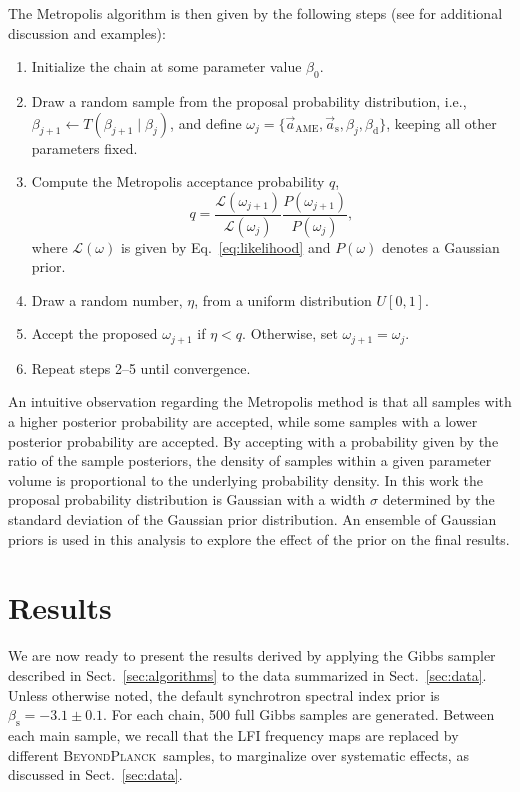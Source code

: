\documentclass[twocolumn]{aa}
\renewcommand{\a}[0]{\vec{a}}
\newcommand{\BP}{\textsc{BeyondPlanck}}
\begin{document}
The Metropolis algorithm is then given by the following steps (see
\citealp{bp01} for additional discussion and examples):
\begin{enumerate}
\item Initialize the chain at some parameter value $\beta_0$.
\item Draw a random sample from the proposal probability distribution,
  i.e., $\beta_{j+1} \leftarrow  T(\beta_{j+1} \mid \beta_j)$, and
  define $\omega_j = \{\a_{\mathrm{AME}},
\a_{\mathrm{s}}, \beta_{j}, \beta_{\mathrm{d}}\}$, keeping
all other parameters fixed. 
\item Compute the Metropolis acceptance probability $q$,
  \begin{equation}
    q = \frac{\mathcal{L}(\omega_{j+1})}{\mathcal{L}(\omega_{j})}\frac{P(\omega_{j+1})}{P(\omega_{j})},
    \label{eq:accept_prob}
  \end{equation}
  where $\mathcal{L}(\omega)$ is given by
  Eq.~\eqref{eq:likelihood} and $P(\omega)$ denotes a Gaussian prior.
\item Draw a random number, $\eta$, from a uniform distribution $U[0,1]$.
\item Accept the proposed $\omega_{j+1}$ if $\eta < q$. Otherwise, set $\omega_{j+1} = \omega_j$.
\item Repeat steps 2--5 until convergence.
\end{enumerate}

An intuitive observation regarding the Metropolis method is that all
samples with a higher posterior probability are accepted, while some
samples with a lower posterior probability are accepted. By accepting
with a probability given by the ratio of the sample posteriors, the
density of samples within a given parameter volume is proportional to
the underlying probability density. In this work the proposal
probability distribution is Gaussian with a width $\sigma$ determined
by the standard deviation of the Gaussian prior distribution. An
ensemble of Gaussian priors is used in this analysis to explore the
effect of the prior on the final results.





\section{Results}
\label{sec:results}


We are now ready to present the results derived by applying the Gibbs
sampler described in Sect.~\ref{sec:algorithms} to the data summarized
in Sect.~\ref{sec:data}. Unless otherwise noted, the default synchrotron spectral index prior is $\beta_{\mathrm{s}}=-3.1\pm0.1$.
For each chain, 500 full Gibbs
samples are generated. Between each main sample, we recall that the
LFI frequency maps are replaced by different \BP\ samples, to
marginalize over systematic effects, as discussed in
Sect.~\ref{sec:data}.
\end{document}
